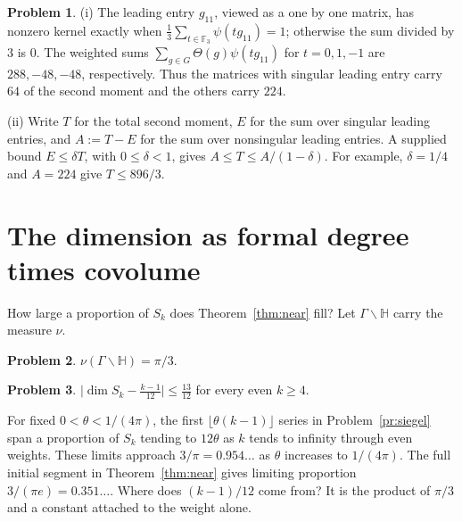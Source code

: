 \documentclass[reqno]{amsart}
\theoremstyle{definition}
\newtheorem{problem}{Problem}[section]
\theoremstyle{plain}
\newcommand{\HH}{\mathbb{H}}
\begin{document}
\begin{problem}\label{pr:finite-singular}
(i) The leading entry \(g_{11}\), viewed as a one by one matrix, has nonzero kernel exactly when \(\frac13\sum_{t\in\mathbb{F}_3}\psi(tg_{11})=1\); otherwise the sum divided by \(3\) is \(0\).  The weighted sums \(\sum_{g\in G}\Theta(g)\psi(tg_{11})\) for \(t=0,1,-1\) are \(288,-48,-48\), respectively.  Thus the matrices with singular leading entry carry \(64\) of the second moment and the others carry \(224\).

(ii) Write \(T\) for the total second moment, \(E\) for the sum over singular leading entries, and \(A:=T-E\) for the sum over nonsingular leading entries.  A supplied bound \(E\le\delta T\), with \(0\le\delta<1\), gives \(A\le T\le A/(1-\delta)\).  For example, \(\delta=1/4\) and \(A=224\) give \(T\le896/3\).
\end{problem}

\section{The dimension as formal degree times covolume}\label{sec:dim}

How large a proportion of \(S_k\) does Theorem~\ref{thm:near} fill?  Let \(\Gamma\backslash\HH\) carry the measure \(\nu\).

\begin{problem}\label{pr:vol}
\(\nu(\Gamma\backslash\HH) = \pi/3\).
\end{problem}

\begin{problem}\label{pr:dim}
\(\bigl\lvert \dim S_k - \frac{k-1}{12}\bigr\rvert \le \frac{13}{12}\) for every even \(k \ge 4\).
\end{problem}

For fixed \(0<\theta<1/(4\pi)\), the first \(\lfloor\theta(k-1)\rfloor\) series in Problem~\ref{pr:siegel} span a proportion of \(S_k\) tending to \(12\theta\) as \(k\) tends to infinity through even weights.  These limits approach \(3/\pi=0.954\ldots\) as \(\theta\) increases to \(1/(4\pi)\).  The full initial segment in Theorem~\ref{thm:near} gives limiting proportion \(3/(\pi e)=0.351\ldots\).  Where does \((k-1)/12\) come from?  It is the product of \(\pi/3\) and a constant attached to the weight alone.
\end{document}

